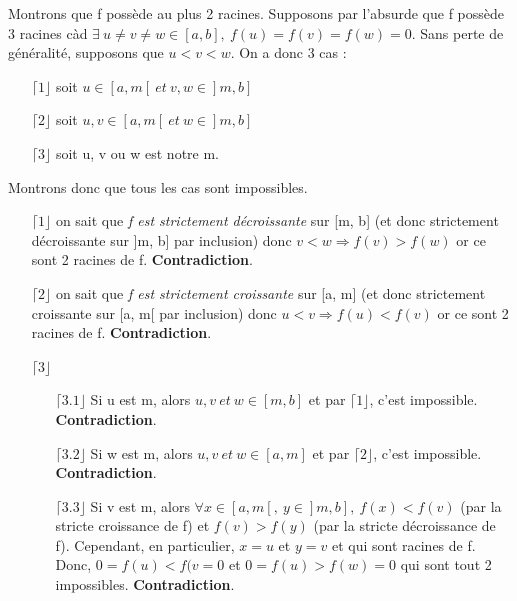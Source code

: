 \documentclass[a4paper, 12pt]{article}
\begin{document}
Montrons que f possède au plus 2 racines. \newline \newline
Supposons par l'absurde que f possède 3 racines càd \newline 
\( \exists ~ u \neq v \neq w \in [a, b], ~ f(u) = f(v) = f(w) = 0 \). \newline
Sans perte de généralité, supposons que \( u < v < w \). \newline
On a donc 3 cas :
\begin{enumerate}
	\item[\(\lceil 1 \rfloor\)] soit \( u \in [a, m[ ~ et ~ v, w \in ]m, b] \)
	\item[\(\lceil 2 \rfloor\)] soit \( u, v \in [a, m[ ~ et ~ w \in ]m, b] \)
	\item[\(\lceil 3 \rfloor\)] soit u, v ou w est notre m.
\end{enumerate}
Montrons donc que tous les cas sont impossibles.
\begin{enumerate}
	\item[\(\lceil 1 \rfloor\)] on sait que \emph{f est strictement décroissante} sur [m, b] (et donc strictement décroissante sur ]m, b] par inclusion) donc \( v < w \Rightarrow f(v) > f(w) \) or ce sont 2 racines de f. \textbf{Contradiction}.
	\item[\(\lceil 2 \rfloor\)] on sait que \emph{f est strictement croissante} sur [a, m] (et donc strictement croissante sur [a, m[ par inclusion) donc \( u < v \Rightarrow f(u) < f(v) \) or ce sont 2 racines de f. \textbf{Contradiction}.
	\item[\(\lceil 3 \rfloor\)] $~$ \newline
	\begin{enumerate}
		\item[\(\lceil 3.1 \rfloor\)] Si u est m, alors \( u, v ~ et ~ w \in [m, b] \) et par \(\lceil 1 \rfloor\), c'est impossible. \textbf{Contradiction}.
		\item[\(\lceil 3.2 \rfloor\)] Si w est m, alors \( u, v ~ et ~ w \in [a, m] \) et par \(\lceil 2 \rfloor\), c'est impossible. \textbf{Contradiction}.
		\item[\(\lceil 3.3 \rfloor\)] Si v est m, alors \( \forall x \in [a, m[, ~ y \in ]m, b], ~ f(x) < f(v) \) (par la stricte croissance de f) et \( f(v) > f(y)\) (par la stricte décroissance de f). Cependant, en particulier, \( x = u \) et \( y = v \) et qui sont racines de f. Donc, \( 0 = f(u) < f(v = 0 \) et \( 0 = f(u) > f(w) = 0 \) qui sont tout 2 impossibles. \textbf{Contradiction}. 
	\end{enumerate}
\end{enumerate}
\end{document}
